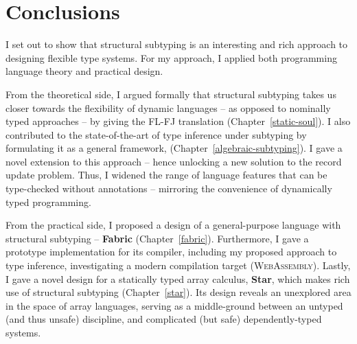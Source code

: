 \chapter{Conclusions}
\label{conclusions}

I set out to show that structural subtyping is an interesting and rich approach to designing flexible type systems. For my approach, I applied both programming language theory and practical design.

From the theoretical side, I argued formally that structural subtyping takes us closer towards the flexibility of dynamic languages -- as opposed to nominally typed approaches -- by giving the FL-FJ translation (Chapter~\ref{static-soul}). I also contributed to the state-of-the-art of type inference under subtyping by formulating it as a general framework, \textbf{\inference{}} (Chapter~\ref{algebraic-subtyping}). 
I gave a novel extension to this approach -- hence unlocking a new solution to the record update problem. Thus, I widened the range of language features that can be type-checked without annotations -- mirroring the convenience of dynamically typed programming.

From the practical side, I proposed a design of a general-purpose language with structural subtyping -- \textbf{Fabric} (Chapter~\ref{fabric}). 
Furthermore, I gave a prototype implementation for its compiler, including my proposed approach to type inference, investigating a modern compilation target (\textsc{WebAssembly}).
Lastly, I gave a novel design for a statically typed array calculus, \textbf{Star}, which makes rich use of structural subtyping (Chapter~\ref{star}). Its design reveals an unexplored area in the space of array languages, serving as a middle-ground between an untyped (and thus unsafe) discipline, and complicated (but safe) dependently-typed systems. 

